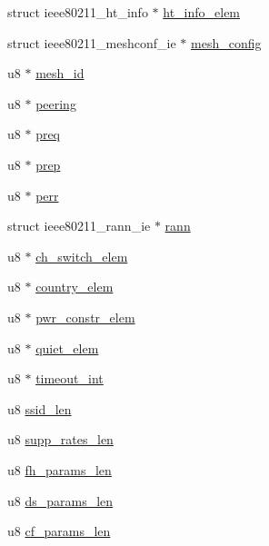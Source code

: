 \begin{DoxyCompactItemize}
\item 
struct ieee80211\-\_\-ht\-\_\-info $\ast$ \hyperlink{structieee802__11__elems_a997ee83c8c6d2c120512c69b41bbfff1}{ht\-\_\-info\-\_\-elem}
\item 
struct ieee80211\-\_\-meshconf\-\_\-ie $\ast$ \hyperlink{structieee802__11__elems_acb3adcd722f89d8cce1e7be9129d6bc4}{mesh\-\_\-config}
\item 
u8 $\ast$ \hyperlink{structieee802__11__elems_a0f1538fd176045e5a10de47f5cefd754}{mesh\-\_\-id}
\item 
u8 $\ast$ \hyperlink{structieee802__11__elems_a8f8fc9384b03389900f4b2d557d4a3a4}{peering}
\item 
u8 $\ast$ \hyperlink{structieee802__11__elems_a0e21b67c3354dad309120d348eac83ed}{preq}
\item 
u8 $\ast$ \hyperlink{structieee802__11__elems_afce540ba301085452d9683d7c08587ae}{prep}
\item 
u8 $\ast$ \hyperlink{structieee802__11__elems_ab2dad797baa297bd9525977b074bcaa4}{perr}
\item 
struct ieee80211\-\_\-rann\-\_\-ie $\ast$ \hyperlink{structieee802__11__elems_a971dd2d54026bf076935c66967876b95}{rann}
\item 
u8 $\ast$ \hyperlink{structieee802__11__elems_a38ba879334b0542a7b1ee9e0e4a6c711}{ch\-\_\-switch\-\_\-elem}
\item 
u8 $\ast$ \hyperlink{structieee802__11__elems_aad534d125ee609e0241201806f9b0fa8}{country\-\_\-elem}
\item 
u8 $\ast$ \hyperlink{structieee802__11__elems_a19eaf1ea27d26716ab4ff793995dd946}{pwr\-\_\-constr\-\_\-elem}
\item 
u8 $\ast$ \hyperlink{structieee802__11__elems_abdf6b7fabeef533a721d298f63162edb}{quiet\-\_\-elem}
\item 
u8 $\ast$ \hyperlink{structieee802__11__elems_a426d32f8654b0c568ef8419d2ff4b775}{timeout\-\_\-int}
\item 
u8 \hyperlink{structieee802__11__elems_a440f44724caffefa0f9c838518a3c790}{ssid\-\_\-len}
\item 
u8 \hyperlink{structieee802__11__elems_a10e3f296dc2be6b8aef4938abfa6af16}{supp\-\_\-rates\-\_\-len}
\item 
u8 \hyperlink{structieee802__11__elems_a322eb9d3c396e5829bb88e7964252d35}{fh\-\_\-params\-\_\-len}
\item 
u8 \hyperlink{structieee802__11__elems_a85a3203b26546e19531ab204d6cf2b7f}{ds\-\_\-params\-\_\-len}
\item 
u8 \hyperlink{structieee802__11__elems_ab9e1ceea5f509efc44108625fcd62d2d}{cf\-\_\-params\-\_\-len}

\end{DoxyCompactItemize}
